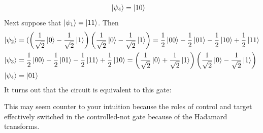 \begin{example}
\begin{align*}
    \ket{\psi_4}&=\ket{10}
    \end{align*}
    Next suppose that $\ket{\psi_1}=\ket{11}$. Then
    \begin{align*}
    \ket{\psi_2}&=(\left(\frac{1}{\sqrt{2}}\ket{0}-\frac{1}{\sqrt{2}}\ket{1}\right)\left(\frac{1}{\sqrt{2}}\ket{0}-\frac{1}{\sqrt{2}}\ket{1}\right)=\frac{1}{2}\ket{00}-\frac{1}{2}\ket{01}-\frac{1}{2}\ket{10}+\frac{1}{2}\ket{11}\\
    \ket{\psi_3}&=\frac{1}{2}\ket{00}-\frac{1}{2}\ket{01}-\frac{1}{2}\ket{11}+\frac{1}{2}\ket{10}=\left(\frac{1}{\sqrt{2}}\ket{0}+\frac{1}{\sqrt{2}}\ket{1}\right)\left(\frac{1}{\sqrt{2}}\ket{0}-\frac{1}{\sqrt{2}}\ket{1}\right)\\
    \ket{\psi_4}&=\ket{01}
    \end{align*}
    It turns out that the circuit is equivalent to this gate:

    This may seem counter to your intuition because the roles of control and target effectively switched in the controlled-not gate because of the Hadamard transforms.
\end{example}
